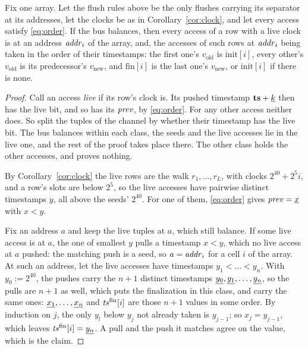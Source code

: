 \begin{theorem}\label{thm:rwmem}
Fix one array. Let the flush rules above be the only flushes carrying its separator at its addresses, let the clocks be as in Corollary~\ref{cor:clock}, and let every access satisfy \eqref{eq:order}. If the bus balances, then every access of a row with a live clock is at an address $\mathit{addr}_i$ of the array, and, the accesses of such rows at $\mathit{addr}_i$ being taken in the order of their timestamps: the first one's $v_{\mathrm{old}}$ is $\mathrm{init}[i]$, every other's $v_{\mathrm{old}}$ is its predecessor's $v_{\mathrm{new}}$, and $\mathrm{fin}[i]$ is the last one's $v_{\mathrm{new}}$, or $\mathrm{init}[i]$ if there is none.
\end{theorem}

\begin{proof}
Call an access \emph{live} if its row's clock is. Its pushed timestamp $\mathbf{ts}+\underline{k}$ then has the live bit, and so has its $\mathit{prev}$, by \eqref{eq:order}. For any other access neither does. So split the tuples of the channel by whether their timestamp has the live bit. The bus balances within each class, the seeds and the live accesses lie in the live one, and the rest of the proof takes place there. The other class holds the other accesses, and proves nothing.

By Corollary~\ref{cor:clock} the live rows are the walk $r_1,\dots,r_L$, with clocks $2^{40}+2^{5}i$, and a row's slots are below $2^{5}$, so the live accesses have pairwise distinct timestamps $y$, all above the seeds' $2^{40}$. For one of them, \eqref{eq:order} gives $\mathit{prev}=\underline{x}$ with $x<y$.

Fix an address $a$ and keep the live tuples at $a$, which still balance. If some live access is at $a$, the one of smallest $y$ pulls a timestamp $x<y$, which no live access at $a$ pushed: the matching push is a seed, so $a=\mathit{addr}_i$ for a cell $i$ of the array. At such an address, let the live accesses have timestamps $y_1<\dots<y_n$. With $y_0:=2^{40}$, the pushes carry the $n+1$ distinct timestamps $\underline{y_0},\underline{y_1},\dots,\underline{y_n}$, so the pulls are $n+1$ as well, which puts the finalization in this class, and carry the same ones: $\underline{x_1},\dots,\underline{x_n}$ and $\mathit{ts}^{\mathrm{fin}}[i]$ are those $n+1$ values in some order. By induction on $j$, the only $y_l$ below $y_j$ not already taken is $y_{j-1}$; so $x_j=y_{j-1}$, which leaves $\mathit{ts}^{\mathrm{fin}}[i]=\underline{y_n}$. A pull and the push it matches agree on the value, which is the claim.
\end{proof}

